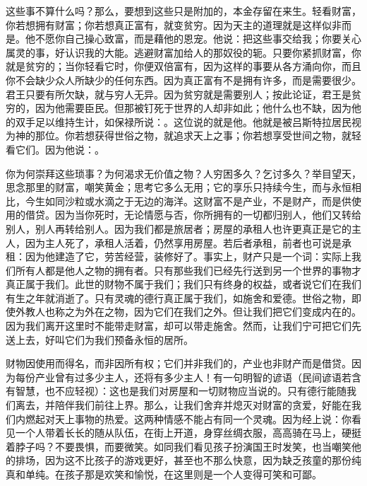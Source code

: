 这些事不算什么吗？那么，要想到这些只是附加的，本金存留在来生。轻看财富，你若想拥有财富；你若想真正富有，就变贫穷。因为天主的道理就是这样似非而是。他不愿你自己操心致富，而是藉他的恩宠。他说：把这些事交给我；你要关心属灵的事，好认识我的大能。逃避财富加给人的那奴役的轭。只要你紧抓财富，你就是贫穷的；当你轻看它时，你便双倍富有，因为这样的事要从各方涌向你，而且你不会缺少众人所缺少的任何东西。因为真正富有不是拥有许多，而是需要很少。君王只要有所欠缺，就与穷人无异。因为贫穷就是需要别人；按此论证，君王是贫穷的，因为他需要臣民。但那被钉死于世界的人却非如此；他什么也不缺，因为他的双手足以维持生计，如保禄所说：。这位说的就是他。他就是被吕斯特拉居民视为神的那位。你若想获得世俗之物，就追求天上之事；你若想享受世间之物，就轻看它们。因为他说：。\par

你为何崇拜这些琐事？为何渴求无价值之物？人穷困多久？乞讨多久？举目望天，思念那里的财富，嘲笑黄金；思考它多么无用；它的享乐只持续今生，而与永恒相比，今生如同沙粒或水滴之于无边的海洋。这财富不是产业，不是财产，而是供使用的借贷。因为当你死时，无论情愿与否，你所拥有的一切都归别人，他们又转给别人，别人再转给别人。因为我们都是旅居者；房屋的承租人也许更真正是它的主人，因为主人死了，承租人活着，仍然享用房屋。若后者承租，前者也可说是承租：因为他建造了它，劳苦经营，装修好了。事实上，财产只是一个词：实际上我们所有人都是他人之物的拥有者。只有那些我们已经先行送到另一个世界的事物才真正属于我们。此世的财物不属于我们；我们只有终身的权益，或者说它们在我们有生之年就消逝了。只有灵魂的德行真正属于我们，如施舍和爱德。世俗之物，即使外教人也称之为外在之物，因为它们在我们之外。但让我们把它们变成内在的。因为我们离开这里时不能带走财富，却可以带走施舍。然而，让我们宁可把它们先送上去，好叫它们为我们预备永恒的居所。\par

财物因使用而得名，而非因所有权；它们并非我们的，产业也非财产而是借贷。因为每份产业曾有过多少主人，还将有多少主人！有一句明智的谚语（民间谚语若含有智慧，也不应轻视）：这也是我们对房屋和一切财物应当说的。只有德行能随我们离去，并陪伴我们前往上界。那么，让我们舍弃并熄灭对财富的贪爱，好能在我们内燃起对天上事物的热爱。这两种情感不能占有同一个灵魂。因为经上说：你看见一个人带着长长的随从队伍，在街上开道，身穿丝绸衣服，高高骑在马上，硬挺着脖子吗？不要畏惧，而要微笑。如同我们看见孩子扮演国王时发笑，也当嘲笑他的排场，因为这不比孩子的游戏更好，甚至也不那么快意，因为缺乏孩童的那份纯真和单纯。在孩子那是欢笑和愉悦，在这里则是一个人变得可笑和可鄙。\par

